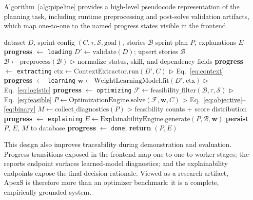 \documentclass[conference]{IEEEtran}
\begin{document}
Algorithm~\ref{alg:pipeline} provides a high-level pseudocode representation of
the planning task, including runtime preprocessing and post-solve validation
artifacts, which map one-to-one to the named progress states visible in the
frontend.

\begin{algorithm}[t]
	\caption{ApexS Asynchronous Planning Pipeline}
	\label{alg:pipeline}
	\begin{algorithmic}[1]
		\Require dataset $D$, sprint config $(C, \tau, \mathcal{S}, \text{goal})$, stories $\mathcal{B}$
		\Ensure sprint plan $P$, explanations $E$
		\State \textbf{progress} $\leftarrow$ \texttt{loading}
		\State $D' \leftarrow \text{validate}(D)$; upsert stories $\mathcal{B}$
		\State $\mathcal{B} \leftarrow \text{preprocess}(\mathcal{B})$
		\hfill $\triangleright$ normalize status, skill, and dependency fields
		\State \textbf{progress} $\leftarrow$ \texttt{extracting}
		\State $\text{ctx} \leftarrow \text{ContextExtractor.run}(D', C)$
		\hfill $\triangleright$ Eq.~\ref{eq:context}
		\State \textbf{progress} $\leftarrow$ \texttt{learning}
		\State $\mathbf{w} \leftarrow \text{WeightLearningModel.fit}(D', \text{ctx})$
		\hfill $\triangleright$ Eq.~\ref{eq:logistic}
		\State \textbf{progress} $\leftarrow$ \texttt{optimizing}
		\State $\mathcal{F} \leftarrow \text{feasibility\_filter}(\mathcal{B}, \tau, \mathcal{S})$
		\hfill $\triangleright$ Eq.~\ref{eq:feasible}
		\State $P \leftarrow \text{OptimizationEngine.solve}(\mathcal{F}, \mathbf{w}, C)$
		\hfill $\triangleright$ Eq.~\ref{eq:objective}--\ref{eq:binary}
		\State $M \leftarrow \text{collect\_diagnostics}(P)$
		\hfill $\triangleright$ feasibility counts + score distribution
		\State \textbf{progress} $\leftarrow$ \texttt{explaining}
		\State $E \leftarrow \text{ExplainabilityEngine.generate}(P, \mathcal{B}, \mathbf{w})$
		\State \textbf{persist} $P$, $E$, $M$ to database
		\State \textbf{progress} $\leftarrow$ \texttt{done}; \textbf{return} $(P, E)$
	\end{algorithmic}
\end{algorithm}

This design also improves traceability during demonstration and evaluation.
Progress transitions exposed in the frontend map one-to-one to worker stages; the
reports endpoint surfaces learned-model diagnostics; and the explainability
endpoints expose the final decision rationale.
Viewed as a research artifact, ApexS is therefore more than an optimizer benchmark:
it is a complete, empirically grounded system.
\end{document}
